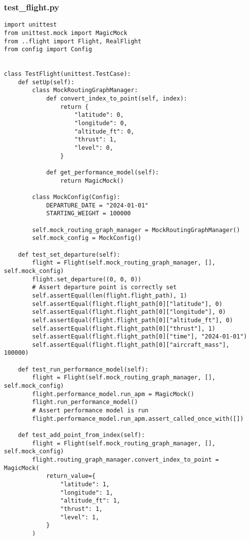 \subsubsection{test_flight.py}
\begin{verbatim}
import unittest
from unittest.mock import MagicMock
from ..flight import Flight, RealFlight
from config import Config


class TestFlight(unittest.TestCase):
    def setUp(self):
        class MockRoutingGraphManager:
            def convert_index_to_point(self, index):
                return {
                    "latitude": 0,
                    "longitude": 0,
                    "altitude_ft": 0,
                    "thrust": 1,
                    "level": 0,
                }

            def get_performance_model(self):
                return MagicMock()

        class MockConfig(Config):
            DEPARTURE_DATE = "2024-01-01"
            STARTING_WEIGHT = 100000

        self.mock_routing_graph_manager = MockRoutingGraphManager()
        self.mock_config = MockConfig()

    def test_set_departure(self):
        flight = Flight(self.mock_routing_graph_manager, [], self.mock_config)
        flight.set_departure((0, 0, 0))
        # Assert departure point is correctly set
        self.assertEqual(len(flight.flight_path), 1)
        self.assertEqual(flight.flight_path[0]["latitude"], 0)
        self.assertEqual(flight.flight_path[0]["longitude"], 0)
        self.assertEqual(flight.flight_path[0]["altitude_ft"], 0)
        self.assertEqual(flight.flight_path[0]["thrust"], 1)
        self.assertEqual(flight.flight_path[0]["time"], "2024-01-01")
        self.assertEqual(flight.flight_path[0]["aircraft_mass"], 100000)

    def test_run_performance_model(self):
        flight = Flight(self.mock_routing_graph_manager, [], self.mock_config)
        flight.performance_model.run_apm = MagicMock()
        flight.run_performance_model()
        # Assert performance model is run
        flight.performance_model.run_apm.assert_called_once_with([])

    def test_add_point_from_index(self):
        flight = Flight(self.mock_routing_graph_manager, [], self.mock_config)
        flight.routing_graph_manager.convert_index_to_point = MagicMock(
            return_value={
                "latitude": 1,
                "longitude": 1,
                "altitude_ft": 1,
                "thrust": 1,
                "level": 1,
            }
        )


\end{verbatim}
